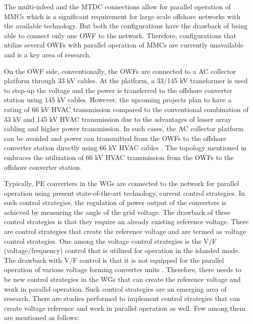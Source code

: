 The multi-infeed and the MTDC connections allow for parallel operation of \gls{MMC}s which is a significant requirement for large scale offshore networks with the available technology. But both the configurations have the drawback of being able to connect only one \gls{OWF} to the network. Therefore, configurations that utilize several \gls{OWF}s with parallel operation of \gls{MMC}s are currently unavailable and is a key area of research.

On the \gls{OWF} side, conventionally, the \gls{OWF}s are connected to a \gls{AC} collector platform through 33 kV cables. At the platform, a 33/145 kV transformer is used to step-up the voltage and the power is transferred to the offshore converter station using 145 kV cables. However, the upcoming projects plan to have a rating of 66 kV \gls{HVAC} transmission compared to the conventional combination of 33 kV and 145 kV \gls{HVAC} transmission due to the advantages of lesser array cabling and higher power transmission. In such cases, the \gls{AC} collector platform can be avoided and power can transmitted from the \gls{OWF}s to the offshore converter station directly using 66 kV \gls{HVAC} cables \cite{dnv66kv}. The topology mentioned in \cite{lozada_ayala_dynamic_2018} embraces the utilization of 66 kV \gls{HVAC} transmission from the \gls{OWF}s to the offshore converter station.

Typically, \gls{PE} converters in the \gls{WG}s are connected to the network for parallel operation using present state-of-the-art technology, current control strategies. In such control strategies, the regulation of power output of the converters is achieved by measuring the angle of the grid voltage. The drawback of these control strategies is that they require an already existing reference voltage. There are control strategies that create the reference voltage and are termed as voltage control strategies. One among the voltage control strategies is the V/F (voltage/frequency) control that is utilized for operation in the islanded mode. The drawback with V/F control is that it is not equipped for the parallel operation of various voltage forming converter units \cite{weise2019comparison}. Therefore, there needs to be new control strategies in the \gls{WG}s that can create the reference voltage and work in parallel operation. Such control strategies are an emerging area of research. There are studies performed to implement control strategies that can create voltage reference and work in parallel operation as well. Few among them are mentioned as follows:

